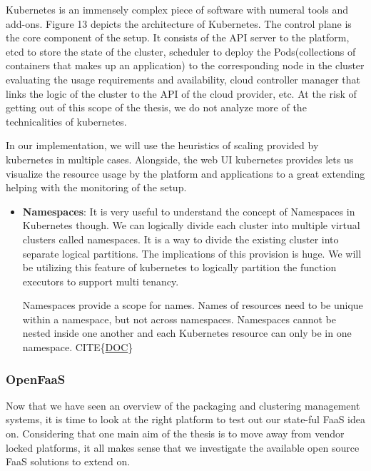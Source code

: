 \documentclass[12pt,titlepage]{article}
\begin{document}
Kubernetes is an immensely complex piece of software with numeral tools and
add-ons. Figure 13 depicts the architecture of Kubernetes. The control plane is
the core component of the setup. It consists of the API server to the platform,
etcd to store the state of the cluster, scheduler to deploy the Pods(collections
of containers that makes up an application) to the corresponding node in the
cluster evaluating the usage requirements and availability, cloud controller
manager that links the logic of the cluster to the API of the cloud provider,
etc. At the risk of getting out of this scope of the thesis, we do not analyze
more of the technicalities of kubernetes.

In our implementation, we will use the heuristics of scaling provided by
kubernetes in multiple cases. Alongside, the web UI kubernetes provides lets us
visualize the resource usage by the platform and applications to a great
extending helping with the monitoring of the setup.

\begin{itemize}
\item \textbf{Namespaces}: It is very useful to understand the concept of Namespaces in Kubernetes though.
We can logically divide each cluster into multiple virtual clusters called
namespaces. It is a way to divide the existing cluster into separate logical
partitions. The implications of this provision is huge. We will be utilizing
this feature of kubernetes to logically partition the function executors to
support multi tenancy. 

Namespaces provide a scope for names. Names of resources need to be unique
within a namespace, but not across namespaces. Namespaces cannot be nested
inside one another and each Kubernetes resource can only be in one namespace. CITE\{\href{https://kubernetes.io/docs/concepts/overview/working-with-objects/namespaces/}{DOC}\}
\end{itemize}


\subsubsection{OpenFaaS}
\label{sec:org6803820}
Now that we have seen an overview of the packaging and clustering management
systems, it is time to look at the right platform to test out our state-ful FaaS
idea on. Considering that one main aim of the thesis is to move away from vendor
locked platforms, it all makes sense that we investigate the available open
source FaaS solutions to extend on.
\end{document}

